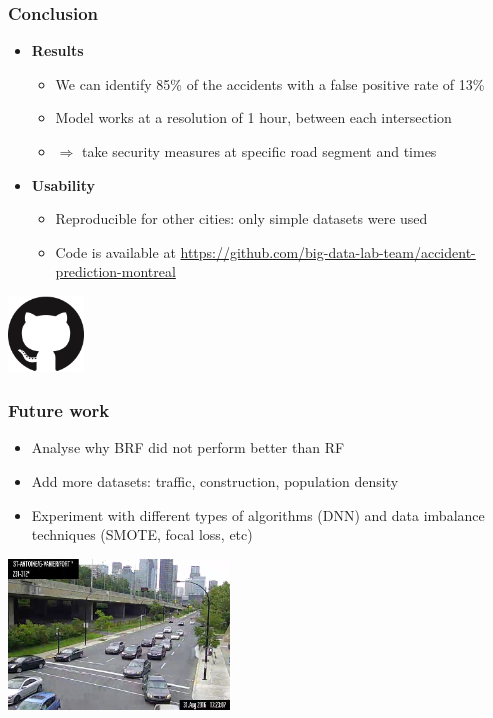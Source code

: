 \documentclass[slidestop,compress,red,mathserif]{beamer}
\begin{document}
\begin{frame}
  \frametitle{Conclusion}
  \begin{itemize}
    \item[] \textbf{Results}
    \begin{itemize} 
    \item We can identify 85\% of the accidents with a false positive rate of 13\%
    \item Model works at a resolution of 1 hour, between each intersection
    \item $\Rightarrow$ take security measures at specific road segment and times
    \end{itemize}
    \item[] \textbf{Usability}
    \begin{itemize} 
    \item Reproducible for other cities: only simple datasets were used
    \item Code is available at \url{https://github.com/big-data-lab-team/accident-prediction-montreal}
    \end{itemize}
  \end{itemize}
  \centering
  \includegraphics[height=2cm]{Figures/github.png}
\end{frame}

\begin{frame}
  \frametitle{Future work}
  \begin{itemize}
    \item Analyse why BRF did not perform better than RF
    \item Add more datasets: traffic, construction, population density
    \item Experiment with different types of algorithms (DNN) and data imbalance techniques (SMOTE, focal loss, etc)
  \end{itemize}
  \centering
  \includegraphics[height=4cm]{Figures/traffic_camera.png}
\end{frame}
\end{document}
